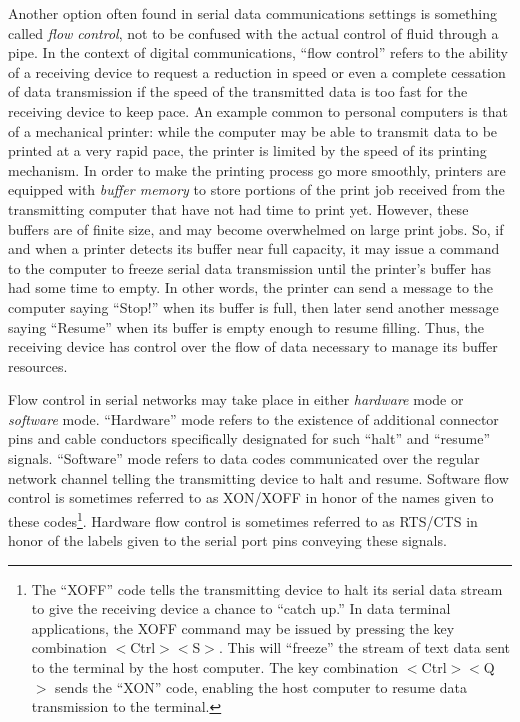 Another option often found in serial data communications settings is something called \textit{flow control}, not to be confused with the actual control of fluid through a pipe.  In the context of digital communications, ``flow control'' refers to the ability of a receiving device to request a reduction in speed or even a complete cessation of data transmission if the speed of the transmitted data is too fast for the receiving device to keep pace.  An example common to personal computers is that of a mechanical printer: while the computer may be able to transmit data to be printed at a very rapid pace, the printer is limited by the speed of its printing mechanism.  In order to make the printing process go more smoothly, printers are equipped with \textit{buffer memory} to store portions of the print job received from the transmitting computer that have not had time to print yet.  However, these buffers are of finite size, and may become overwhelmed on large print jobs.  So, if and when a printer detects its buffer near full capacity, it may issue a command to the computer to freeze serial data transmission until the printer's buffer has had some time to empty.  In other words, the printer can send a message to the computer saying ``Stop!'' when its buffer is full, then later send another message saying ``Resume'' when its buffer is empty enough to resume filling.  Thus, the receiving device has control over the flow of data necessary to manage its buffer resources.    

Flow control in serial networks may take place in either \textit{hardware} mode or \textit{software} mode.  ``Hardware'' mode refers to the existence of additional connector pins and cable conductors specifically designated for such ``halt'' and ``resume'' signals.  ``Software'' mode refers to data codes communicated over the regular network channel telling the transmitting device to halt and resume.  Software flow control is sometimes referred to as XON/XOFF in honor of the names given to these codes\footnote{The ``XOFF'' code tells the transmitting device to halt its serial data stream to give the receiving device a chance to ``catch up.''  In data terminal applications, the XOFF command may be issued by pressing the key combination $<$Ctrl$><$S$>$.  This will ``freeze'' the stream of text data sent to the terminal by the host computer.  The key combination $<$Ctrl$><$Q$>$ sends the ``XON'' code, enabling the host computer to resume data transmission to the terminal.}.  Hardware flow control is sometimes referred to as RTS/CTS in honor of the labels given to the serial port pins conveying these signals.

